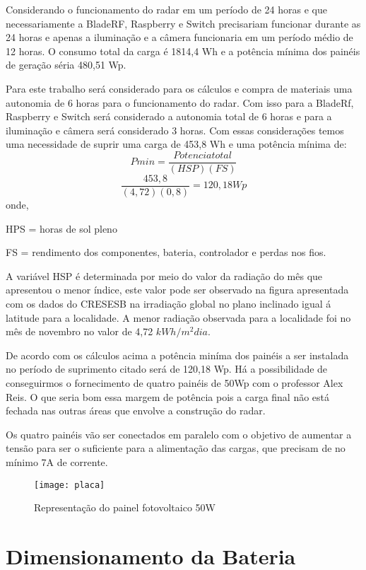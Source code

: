 Considerando o funcionamento do radar em um período de 24 horas e que necessariamente a BladeRF, Raspberry e Switch precisariam funcionar durante as 24 horas e apenas a iluminação e a câmera funcionaria em um período médio de 12 horas. O consumo total da carga é 1814,4 Wh e a potência mínima dos painéis de geração séria 480,51 Wp.

Para este trabalho será considerado para os cálculos e compra de materiais uma autonomia de 6 horas para o funcionamento do radar. Com isso para a BladeRf, Raspberry e Switch será considerado a autonomia total de 6 horas e para a iluminação e câmera será considerado 3 horas. Com essas considerações temos uma necessidade de suprir uma carga de 453,8 Wh e uma potência mínima de:
\begin{equation}
    Pmin = \frac{Potencia total}{(HSP)(FS)} 
\end{equation}
\begin{equation}
    \frac{453,8}{(4,72)(0,8)} = 120,18 Wp
\end{equation}
onde, 

HPS = horas de sol pleno

FS = rendimento dos componentes, bateria, controlador e perdas nos fios.

A variável HSP é determinada por meio do valor da radiação do mês que apresentou o menor índice, este valor pode ser observado na figura apresentada com os dados do CRESESB na irradiação global no plano inclinado igual á latitude para a localidade. A menor radiação observada para a localidade foi no mês de novembro no valor de 4,72 $kWh/m^2dia$. 
 
De acordo com os cálculos acima a potência miníma dos painéis a ser instalada no período de suprimento citado será de 120,18 Wp. Há a possibilidade de conseguirmos o fornecimento de quatro painéis de 50Wp com o professor Alex Reis. O que seria bom essa margem de potência pois a carga final não está fechada nas outras áreas que envolve a construção do radar. 

Os quatro painéis vão ser conectados em paralelo com o objetivo de aumentar a tensão para ser o suficiente para a alimentação das cargas, que precisam de no mínimo 7A de corrente. 

\begin{figure}[h!]
\centering
\texttt{[image: placa]}
\caption{Representação do painel fotovoltaico 50W}
\label{fig:tabela}
\end{figure}

\section{Dimensionamento da Bateria}

